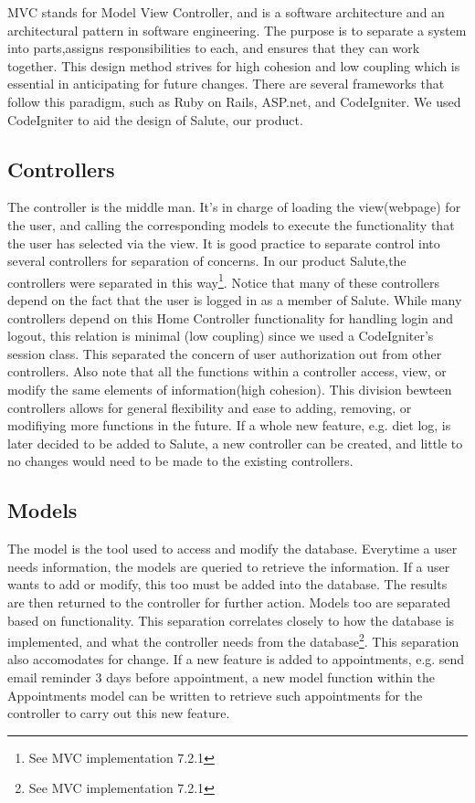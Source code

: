 \documentclass[12pt]{report}
\begin{document}
MVC stands for Model View Controller, and is a software architecture and an architectural pattern in software engineering. The purpose is to separate a system into parts,assigns responsibilities to each, and ensures that they can work together. This design method strives for high cohesion and low coupling which is essential in anticipating for future changes. There are several frameworks that follow this paradigm, such as Ruby on Rails, ASP.net, and CodeIgniter. We used CodeIgniter to aid the design of Salute, our product.  

\subsection{Controllers}

The controller is the middle man. It's in charge of loading the view(webpage) for the user, and calling the corresponding models to execute the functionality that the user has selected via the view. 
It is good practice to separate control into several controllers for separation of concerns. In our product Salute,the controllers were separated in this way\footnote{See MVC implementation 7.2.1}. Notice that many of these controllers depend on the fact that the user is logged in as a member of Salute. While many controllers depend on this Home Controller functionality for handling login and logout, this relation is minimal (low coupling) since we used a CodeIgniter's session class. This separated the concern of user authorization out from other controllers. 
Also note that all the functions within a controller access, view, or modify the same elements of information(high cohesion). This division bewteen controllers allows for general flexibility and ease to adding, removing, or modifiying more functions in the future. If a whole new feature, e.g. diet log, is later decided to be added to Salute, a new controller can be created, and little to no changes would need to be made to the existing controllers. 
\subsection{Models}
The model is the tool used to access and modify the database. Everytime a user needs information, the models are queried to retrieve the information. If a user wants to add or modify, this too must be added into the database. The results are then returned to the controller for further action.
Models too are separated based on functionality. This separation correlates closely to how the database is implemented, and what the controller needs from the database\footnote{See MVC implementation 7.2.1}. This separation also accomodates for change. If a new feature is added to appointments, e.g. send email reminder 3 days before appointment, a new model function within the Appointments model can be written to retrieve such appointments for the controller to carry out this new feature. 
\end{document}
